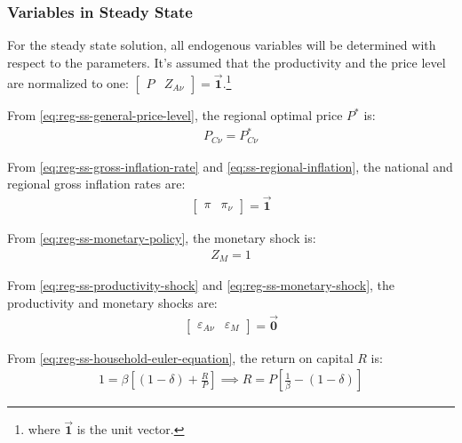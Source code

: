 \documentclass[
	thesis.tex
	]{subfiles}
\begin{document}

\subsubsection*{Variables in Steady State}


For the steady state solution, all endogenous variables will be determined with respect to the parameters. It's assumed that the productivity and the price level are normalized to one: $\left[ \begin{smallmatrix} P & Z_{A\nu} \end{smallmatrix} \right] = \vec{\bm{1}}$.\footnote{where $\vec{\bm{1}}$ is the unit vector.}

From \ref{eq:reg-ss-general-price-level}, the regional optimal price $P^\ast$ is:
\begin{align}
	P_{C\nu} = P_{C\nu}^\ast
\end{align}

From \ref{eq:reg-ss-gross-inflation-rate} and \ref{eq:ss-regional-inflation}, the national and regional gross inflation rates are:
\begin{align}
	\begin{bmatrix}
		\pi & \pi_{\nu}
	\end{bmatrix} = \vec{\bm{1}}
\end{align}

From \ref{eq:reg-ss-monetary-policy}, the monetary shock is:
\begin{align}
	Z_{M} = 1
\end{align}

From \ref{eq:reg-ss-productivity-shock} and \ref{eq:reg-ss-monetary-shock}, the productivity and monetary shocks are:
\begin{align}
	\begin{bmatrix}
		\varepsilon_{A\nu} & \varepsilon_{M}
	\end{bmatrix} = \vec{\bm{0}}
\end{align}

From \ref{eq:reg-ss-household-euler-equation}, the return on capital $R$ is:
\begin{align}
	\label{eq:reg-ss-return-on-capital}
	1 = \beta \left[ (1-\delta) + \frac{R}{P} \right] \implies 
	R = P\left[ \frac{1}{\beta} - (1-\delta) \right]
\end{align}
\end{document}
